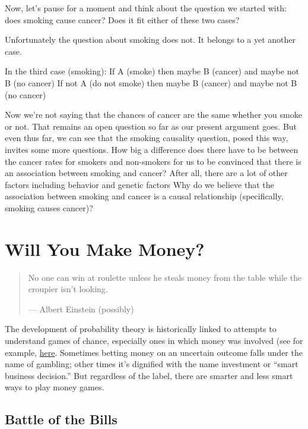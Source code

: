 \documentclass[]{book}
\begin{document}
Now, let's pause for a moment and think about the question we started with: does smoking cause cancer? Does it fit either of these two cases?

Unfortunately the question about smoking does not. It belongs to a yet another case.

In the third case (smoking):
If A (smoke) then maybe B (cancer) and maybe not B (no cancer)
If not A (do not smoke) then maybe B (cancer) and maybe not B (no cancer)

Now we're not saying that the chances of cancer are the same whether you smoke or not. That remains an open question so far as our present argument goes. But even thus far, we can see that the smoking causality question, posed this way, invites some more questions.
How big a difference does there have to be between the cancer rates for smokers and non-smokers for us to be convinced that there is an association between smoking and cancer?
After all, there are a lot of other factors including behavior and genetic factors
Why do we believe that the association between smoking and cancer is a causal relationship (specifically, smoking causes cancer)?

\hypertarget{will-you-make-money}{%
\chapter{Will You Make Money?}\label{will-you-make-money}}

\begin{quote}
No one can win at roulette unless he steals money from the table while the croupier isn't looking.

--- Albert Einstein (possibly)
\end{quote}

The development of probability theory is historically linked to attempts to understand games of chance, especially ones in which money was involved (see for example, \href{http://sites.math.rutgers.edu/~cherlin/History/Papers2000/cheng.html}{here}. Sometimes betting money on an uncertain outcome falls under the name of gambling; other times it's dignified with the name investment or ``smart business decision.'' But regardless of the label, there are smarter and less smart ways to play money games.

\hypertarget{battle-of-the-bills}{%
\section*{Battle of the Bills}\label{battle-of-the-bills}}
\end{document}
